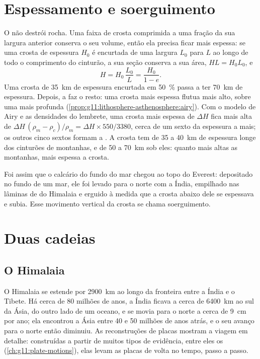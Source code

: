 \section{Espessamento e soerguimento}

O  não destrói rocha. Uma faixa de crosta comprimida a uma
fração da sua largura anterior conserva o seu volume, então ela precisa
ficar mais espessa: se uma crosta de espessura $H_0$ é encurtada de uma
largura $L_0$ para $L$ ao longo de todo o comprimento do cinturão, a sua
seção conserva a sua área, $H L = H_0 L_0$, e
\[
  H = H_0\,\frac{L_0}{L} = \frac{H_0}{1 - e}.
\]
Uma crosta de \qty{35}{km} de espessura encurtada em \qty{50}{\percent}
passa a ter \qty{70}{km} de espessura. Depois, a  faz o resto: uma
crosta mais espessa flutua mais alto, sobre uma  mais profunda
(\cref{prop:g11:lithosphere-asthenosphere:airy}). Com o modelo de Airy e as
densidades do lembrete, uma crosta mais espessa de $\Delta H$ fica mais alta
de $\Delta H\,(\rho_m - \rho_c)/\rho_m = \Delta H
\times 550/3380$, cerca de um sexto da espessura a mais; os outros cinco
sextos formam a . A crosta tem de \num{35} a \qty{40}{km} de espessura
longe dos cinturões de montanhas, e de 50 a \qty{70}{km} sob eles: quanto
mais altas as montanhas, mais espessa a crosta.

Foi assim que o calcário do fundo do mar chegou ao topo do Everest:
depositado no fundo de um mar, ele foi levado para o norte com a Índia,
empilhado nas lâminas de  do Himalaia e erguido à medida que a
crosta abaixo dele se espessava e subia. Esse movimento vertical da crosta
se chama soerguimento.

\section{Duas cadeias}

\subsection{O Himalaia}

O Himalaia se estende por \qty{2900}{km} ao longo da fronteira entre a Índia
e o Tibete. Há cerca de 80 milhões de anos, a Índia ficava a cerca de
\qty{6400}{km} ao sul da Ásia, do outro lado de um oceano, e se movia para o
norte a cerca de \qty{9}{cm} por ano; ela encontrou a Ásia entre 40 e 50
milhões de anos atrás, e o seu avanço para o norte então diminuiu. As
reconstruções de placas mostram a viagem em detalhe: construídas a partir
de muitos tipos de evidência, entre eles os 
(\cref{ch:g11:plate-motions}), elas levam as placas de volta no tempo, passo
a passo.

